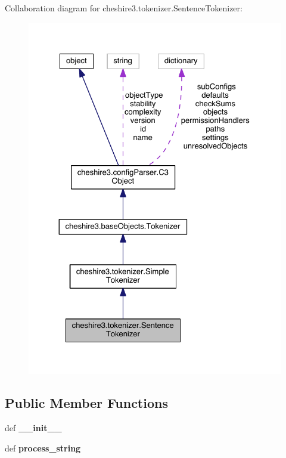 Collaboration diagram for cheshire3.\-tokenizer.\-Sentence\-Tokenizer\-:
\nopagebreak
\begin{figure}[H]
\begin{center}
\leavevmode
\includegraphics[width=326pt]{classcheshire3_1_1tokenizer_1_1_sentence_tokenizer__coll__graph}
\end{center}
\end{figure}
\subsection*{Public Member Functions}
\begin{DoxyCompactItemize}
\item 
\hypertarget{classcheshire3_1_1tokenizer_1_1_sentence_tokenizer_a3346333cf21d65ed9f2924d8b1b31d42}{def {\bfseries \-\_\-\-\_\-init\-\_\-\-\_\-}}\label{classcheshire3_1_1tokenizer_1_1_sentence_tokenizer_a3346333cf21d65ed9f2924d8b1b31d42}

\item 
\hypertarget{classcheshire3_1_1tokenizer_1_1_sentence_tokenizer_a324b33d777c0869a002e6f07cef94a47}{def {\bfseries process\-\_\-string}}\label{classcheshire3_1_1tokenizer_1_1_sentence_tokenizer_a324b33d777c0869a002e6f07cef94a47}

\end{DoxyCompactItemize}
